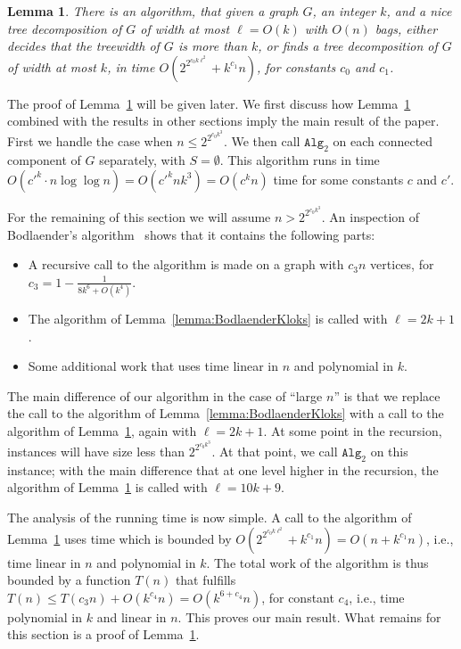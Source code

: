 \documentclass[a4paper,11pt]{article}
\newtheorem{lemma}{Lemma}[section]
\theoremstyle{definition}
\theoremstyle{remark}
\newcommand{\alg}[1]{\mathtt{Alg}_{#1}}
\begin{document}
\begin{lemma}
  There is an algorithm, that given a graph $G$, an integer $k$, and a
  nice tree decomposition of $G$ of width at most $\ell = O(k)$ with
  $O(n)$ bags, either decides that the treewidth of $G$ is more than 
  $k$, or finds a tree decomposition of $G$ of width at most $k$, in time
  $O( 2^{2^{c_0 k \ell^2}} + k^{c_1} n)$, for constants
  $c_0$ and $c_1$.
  \label{lemma:tablelookupBodlaenderKloks}
\end{lemma}

The proof of Lemma~\ref{lemma:tablelookupBodlaenderKloks} will be
given later.  We first discuss how
Lemma~\ref{lemma:tablelookupBodlaenderKloks} combined with the results
in other sections imply the main result of the paper.  First we handle
the case when $n \leq 2^{2^{c_0 k^3}}$.  We then call $\alg{2}$ on
each connected component of $G$ separately, with $S=\emptyset$.  This
algorithm runs in time $O(c'^k \cdot n \log \log n) = O(c'^k n k^3) =
O(c^k n)$ time for some constants $c$ and $c'$.

For the remaining of this section we will assume $n > 2^{2^{c_0 k^3}}$.
An inspection of Bodlaender's algorithm~\cite{Bodlaender96} shows that it
contains the following parts:
\begin{itemize}
\item A recursive call to the algorithm is made on a graph with $c_3
  n$ vertices, for $c_3 = 1 - \frac{1}{8k^6+ O(k^4)}$.
\item The algorithm of Lemma~\ref{lemma:BodlaenderKloks} is called
  with $\ell = 2k+1$.
\item Some additional work that uses time linear in $n$ and
  polynomial in $k$.
\end{itemize}

The main difference of our algorithm in the case of ``large $n$'' is
that we replace the call to the algorithm of
Lemma~\ref{lemma:BodlaenderKloks} with a call to the algorithm of
Lemma~\ref{lemma:tablelookupBodlaenderKloks}, again with $\ell =
2k+1$.  At some point in the recursion, instances will have size less
than $2^{2^{c_0 k^3}}$.  At that point, we call $\alg{2}$ on this
instance; with the main difference that at one level higher in the
recursion, the algorithm of
Lemma~\ref{lemma:tablelookupBodlaenderKloks} is called with $\ell =
10k+9$.

The analysis of the running time is now simple.  A call to the
algorithm of Lemma~\ref{lemma:tablelookupBodlaenderKloks} uses time
which is bounded by $O( 2^{2^{c_0 k \ell^2}} + k^{c_1} n) = O(n +
k^{c_1} n)$, i.e., time linear in $n$ and polynomial in $k$.  The
total work of the algorithm is thus bounded by a function $T(n)$ that
fulfills $T(n) \leq T(c_3 n) + O(k^{c_4}n) = O(k^{6+c_4}n)$, for
constant $c_4$, i.e., time polynomial in $k$ and linear in $n$.  This
proves our main result.  What remains for this section is a proof of
Lemma~\ref{lemma:tablelookupBodlaenderKloks}.
\end{document}
